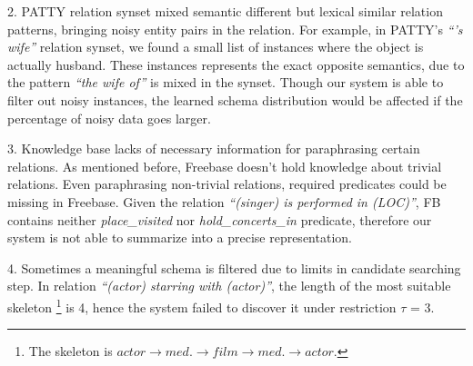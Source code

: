 2. PATTY relation synset mixed semantic different but lexical similar
relation patterns, bringing noisy entity pairs in the relation.
For example, in PATTY's \textit{``'s wife''} relation synset, we found a small list of instances
where the object is actually husband.
These instances represents the exact opposite semantics,
due to the pattern \textit{``the wife of''} is mixed in the synset.
Though our system is able to filter out noisy instances, the learned schema
distribution would be affected if the percentage of noisy data goes larger.

3. Knowledge base lacks of necessary information for paraphrasing certain relations.
As mentioned before, Freebase doesn't hold knowledge about trivial relations.
Even paraphrasing non-trivial relations, required predicates could be missing in Freebase.
Given the relation \textit{``(singer) is performed in (LOC)''}, FB contains			%
neither \textit{place\_visited} nor \textit{hold\_concerts\_in} predicate, therefore
our system is not able to summarize into a precise representation.

4. Sometimes a meaningful schema is filtered due to limits in candidate searching step.
In relation \textit{``(actor) starring with (actor)''}, the length of the most suitable skeleton
\footnote{The skeleton is $actor \rightarrow med. \rightarrow film \rightarrow med. \rightarrow actor$.}
is 4, hence the system failed to discover it under restriction $\tau$ = 3.


